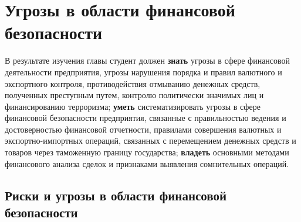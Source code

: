 \documentclass[a4paper,12pt,fleqn]{article} %
\author{}
\title{}
\date{}
\begin{document}
	
\tableofcontents

\newpage

\section{Угрозы в области финансовой безопасности}

\begin{tcolorbox}[colback=yellow!40!red!10!,colframe=yellow!40!red]


В результате изучения главы студент должен \textbf{знать} угрозы в сфере финансовой деятельности предприятия, угрозы нарушения порядка и правил валютного и экспортного контроля, противодействия отмыванию денежных средств, полученных преступным путем, контролю политически значимых лиц и финансированию терроризма; \textbf{уметь} систематизировать угрозы в сфере финансовой безопасности предприятия, связанные с правильностью ведения и достоверностью финансовой отчетности, правилами совершения валютных и экспортно-импортных операций, связанных с перемещением денежных средств и товаров через таможенную границу государства; \textbf{владеть} основными методами финансового анализа сделок и признаками выявления сомнительных операций. 
\end{tcolorbox}


\subsection{Риски и угрозы в области финансовой безопасности}


\end{document}
